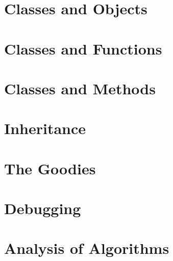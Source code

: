 \documentclass[a4paper,11pt]{book}
\begin{document}
\chapter{Classes and Objects}
\chapter{Classes and Functions}
\chapter{Classes and Methods}
\chapter{Inheritance}
\chapter{The Goodies}
\chapter{Debugging}
\chapter{Analysis of Algorithms}
\end{document}
